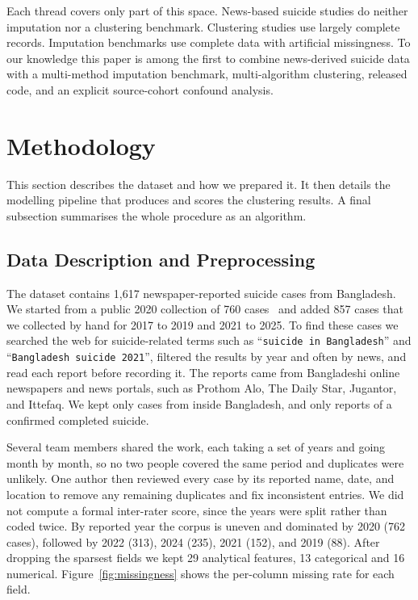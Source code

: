 \documentclass[conference]{IEEEtran}
\newcommand{\snippet}[1]{``\texttt{#1}''}
\begin{document}
Each thread covers only part of this space. News-based suicide studies do neither imputation nor a clustering benchmark. Clustering studies use largely complete records. Imputation benchmarks use complete data with artificial missingness. To our knowledge this paper is among the first to combine news-derived suicide data with a multi-method imputation benchmark, multi-algorithm clustering, released code, and an explicit source-cohort confound analysis.


\section{Methodology}
\label{sec:Methodology}


This section describes the dataset and how we prepared it. It then details the modelling pipeline that produces and scores the clustering results. A final subsection summarises the whole procedure as an algorithm.

\subsection{Data Description and Preprocessing}
The dataset contains 1{,}617 newspaper-reported suicide cases from Bangladesh. We started from a public 2020 collection of 760 cases~\cite{alom2020bangladesh} and added 857 cases that we collected by hand for 2017 to 2019 and 2021 to 2025. To find these cases we searched the web for suicide-related terms such as \snippet{suicide in Bangladesh} and \snippet{Bangladesh suicide 2021}, filtered the results by year and often by news, and read each report before recording it. The reports came from Bangladeshi online newspapers and news portals, such as Prothom Alo, The Daily Star, Jugantor, and Ittefaq. We kept only cases from inside Bangladesh, and only reports of a confirmed completed suicide.

Several team members shared the work, each taking a set of years and going month by month, so no two people covered the same period and duplicates were unlikely. One author then reviewed every case by its reported name, date, and location to remove any remaining duplicates and fix inconsistent entries. We did not compute a formal inter-rater score, since the years were split rather than coded twice. By reported year the corpus is uneven and dominated by 2020 (762 cases), followed by 2022 (313), 2024 (235), 2021 (152), and 2019 (88). After dropping the sparsest fields we kept 29 analytical features, 13 categorical and 16 numerical. Figure~\ref{fig:missingness} shows the per-column missing rate for each field.
\end{document}
